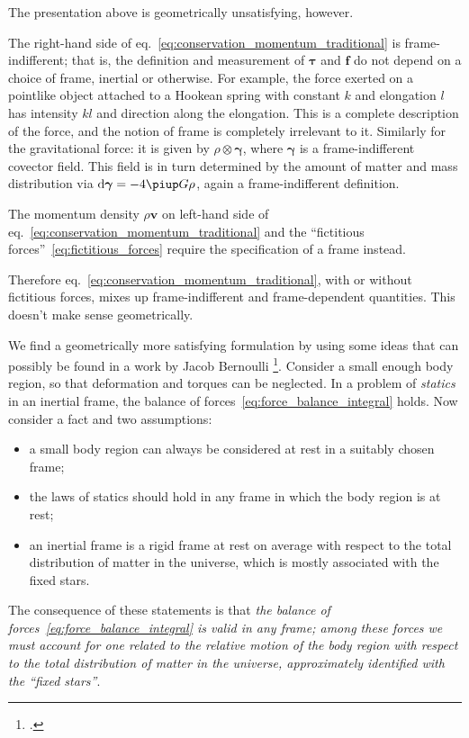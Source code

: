 \documentclass[\ifafour a4paper,12pt,\else a5paper,10pt,\fi%
onecolumn,oneside,article,%
british%
]{memoir}
\theoremstyle{remark}
\theoremstyle{innote}
\newcommand*{\citep}{\footcites}
\newcommand*{\pu}{\piup}%
\newcommand*{\di}{\mathrm{d}}%
\renewcommand*{\|}[1][]{\nonscript\,#1\vert\nonscript\;\mathopen{}}
\newcommand*{\sect}{\S}%
\newcommand*{\eqn}{eq.}%
\newcommand*{\yTT}{\tau}
\newcommand*{\yT}{\bm{\yTT}}
\newcommand*{\ybb}{f}
\newcommand*{\yb}{\bm{\ybb}}
\newcommand*{\yvvt}{v}
\newcommand*{\yvt}{\bm{\yvvt}}
\newcommand*{\yffg}{\gamma}
\newcommand*{\yfg}{\bm{\yffg}}
\begin{document}
\bigskip

The presentation above is geometrically unsatisfying, however.

The right-hand side of \eqn~\eqref{eq:conservation_momentum_traditional} is
frame-indifferent; that is, the definition and measurement of $\yT$ and
$\yb$ do not depend on a choice of frame, inertial or otherwise. For
example, the force exerted on a pointlike object attached to a Hookean
spring with constant $k$ and elongation $l$ has intensity $kl$ and
direction along the elongation. This is a complete description of the
force, and the notion of frame is completely irrelevant to it. Similarly
for the gravitational force: it is given by $\rho\otimes\yfg$, where $\yfg$
is a frame-indifferent covector field. This field is in turn determined by
the amount of matter and mass distribution via $\di\yfg = - 4\pu G \rho$,
again a frame-indifferent definition.

The momentum density $\rho\yvt$ on left-hand side of
\eqn~\eqref{eq:conservation_momentum_traditional} and the
\enquote{fictitious forces}~\eqref{eq:fictitious_forces} require the
specification of a frame instead.

Therefore \eqn~\eqref{eq:conservation_momentum_traditional}, with or
without fictitious forces, mixes up frame-indifferent and frame-dependent
quantities. This doesn't make sense geometrically.

We find a geometrically more satisfying formulation by using some ideas
that can possibly be found in a work by Jacob Bernoulli
\citep{bernoulli1703}[see][p.~104]{truesdell1968}{noll1963}[\sect~I.13]{truesdell1977_r1991}. Consider a small
enough body region, so that deformation and torques can be neglected. In a
problem of \emph{statics} in an inertial frame, the balance of
forces~\eqref{eq:force_balance_integral} holds. Now consider a fact and two
assumptions:
\begin{itemize}
\item a small body region can always be considered at rest in a suitably
  chosen frame;
\item the laws of statics should hold in any frame in which the body region
  is at rest;
\item an inertial frame is a rigid frame at rest on average with respect to
  the total distribution of matter in the universe, which is mostly
  associated with the fixed stars.
\end{itemize}
The consequence of these statements is that \emph{the balance of
  forces~\eqref{eq:force_balance_integral} is valid in any frame; among
  these forces we must account for one related to the relative motion of
  the body region with respect to the total distribution of matter in the
  universe, approximately identified with the \enquote{fixed stars}}.
\end{document}

